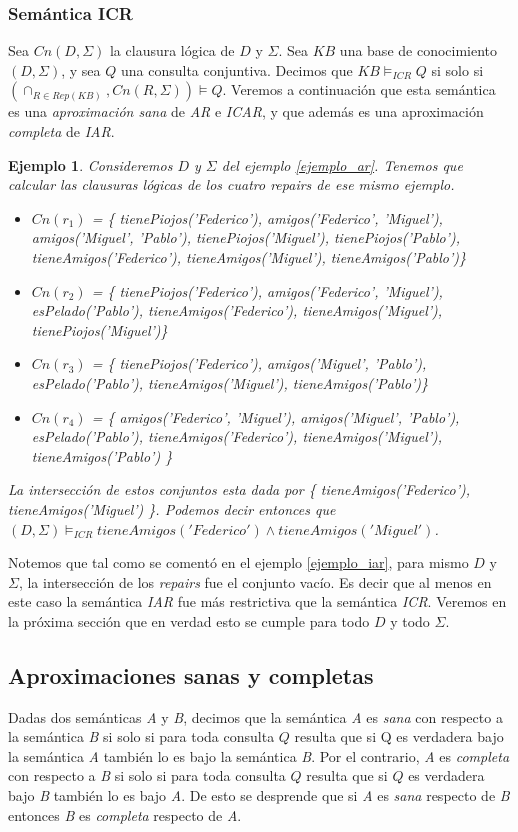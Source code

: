\documentclass[11pt,a4paper,twoside]{tesis}
\newtheorem{exmp}{Ejemplo}
\begin{document}
\subsubsection{Semántica ICR}
Sea $Cn(D,\Sigma)$ la clausura lógica de $D$ y $\Sigma$. Sea $KB$ una base de conocimiento $(D, \Sigma)$, y sea $Q$ una consulta conjuntiva. Decimos que $KB \models_{ICR} Q $ si solo si $(\cap_{R \in Rep(KB)}, Cn(R, \Sigma))\models Q$. Veremos a continuación que esta semántica es una \textit{aproximación \textit{sana}} de \textit{AR} e \textit{ICAR}, y que además es una aproximación \textit{completa} de \textit{IAR}.

\begin{exmp}
Consideremos $D$ y $\Sigma$ del ejemplo \ref{ejemplo_ar}. Tenemos que calcular las clausuras lógicas de los cuatro \textit{repairs} de ese mismo ejemplo.
    \begin{itemize}
        \item $Cn(r_1)$ = \{ tienePiojos('Federico'), amigos('Federico', 'Miguel'), amigos('Miguel', 'Pablo'), tienePiojos('Miguel'), tienePiojos('Pablo'), tieneAmigos('Federico'), tieneAmigos('Miguel'), tieneAmigos('Pablo')\}
        \item $Cn(r_2)$ = \{ tienePiojos('Federico'), amigos('Federico', 'Miguel'), esPelado('Pablo'), tieneAmigos('Federico'), tieneAmigos('Miguel'), tienePiojos('Miguel')\}
        \item $Cn(r_3)$ = \{ tienePiojos('Federico'), amigos('Miguel', 'Pablo'), esPelado('Pablo'), tieneAmigos('Miguel'), tieneAmigos('Pablo')\}
        \item $Cn(r_4)$ = \{ amigos('Federico', 'Miguel'), amigos('Miguel', 'Pablo'), esPelado('Pablo'), tieneAmigos('Federico'), tieneAmigos('Miguel'), tieneAmigos('Pablo') \}
    \end{itemize}
La intersección de estos conjuntos esta dada por \{ tieneAmigos('Federico'), tieneAmigos('Miguel') \}. Podemos decir entonces que $(D, \Sigma) \models_{ICR} tieneAmigos('Federico') \land tieneAmigos('Miguel')$.
\end{exmp}
Notemos que tal como se comentó en el ejemplo \ref{ejemplo_iar}, para mismo $D$ y $\Sigma$, la intersección de los \textit{repairs} fue el conjunto vacío. Es decir que al menos en este caso la semántica \textit{IAR} fue más restrictiva que la semántica \textit{ICR}. Veremos en la próxima sección que en verdad esto se cumple para todo $D$ y todo $\Sigma$.

\subsection{Aproximaciones sanas y completas}
Dadas dos semánticas \textit{A} y \textit{B}, decimos que la semántica \textit{A} es \textit{sana} con respecto a la semántica \textit{B} si solo si para toda consulta $Q$ resulta que si Q es verdadera bajo la semántica \textit{A} también lo es bajo la semántica \textit{B}. Por el contrario, \textit{A} es \textit{completa} con respecto a \textit{B} si solo si para toda consulta $Q$ resulta que si $Q$ es verdadera bajo \textit{B} también lo es bajo \textit{A}. De esto se desprende que si \textit{A} es \textit{sana} respecto de \textit{B} entonces \textit{B} es \textit{completa} respecto de \textit{A}.
\end{document}
